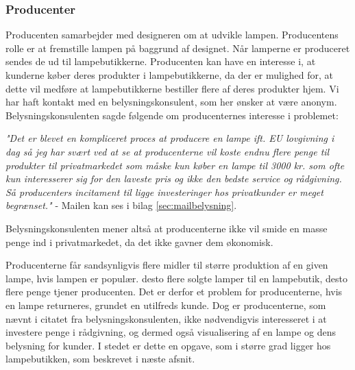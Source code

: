 \subsubsection{Producenter}
Producenten samarbejder med designeren om at udvikle lampen. Producentens rolle er at fremstille lampen på baggrund af designet. Når lamperne er produceret sendes de ud til lampebutikkerne. Producenten kan have en interesse i, at kunderne køber deres produkter i lampebutikkerne, da der er mulighed for, at dette vil medføre at lampebutikkerne bestiller flere af deres produkter hjem. Vi har haft kontakt med en belysningskonsulent, som her ønsker at være anonym. Belysningskonsulenten sagde følgende om producenternes interesse i problemet:

\begin{center}
\textit{"Det er blevet en kompliceret proces at producere en lampe ift. EU lovgivning i dag så jeg har svært ved at se at producenterne vil koste endnu flere penge til produkter til privatmarkedet som måske kun køber en lampe til 3000 kr. som ofte kun interesserer sig for den laveste pris og ikke den bedste service og rådgivning. Så producenters incitament til ligge investeringer hos privatkunder er meget begrænset."} - Mailen kan ses i bilag \ref{sec:mailbelysning}. 
\end{center}

Belysningskonsulenten mener altså at producenterne ikke vil smide en masse penge ind i privatmarkedet, da det ikke gavner dem økonomisk. 

Producenterne får sandsynligvis flere midler til større produktion af en given lampe, hvis lampen er populær. desto flere solgte lamper til en lampebutik, desto flere penge tjener producenten. Det er derfor et problem for producenterne, hvis en lampe returneres, grundet en utilfreds kunde. Dog er producenterne, som nævnt i citatet fra belysningskonsulenten, ikke nødvendigvis interesseret i at investere penge i rådgivning, og dermed også visualisering af en lampe og dens belysning for kunder. I stedet er dette en opgave, som i større grad ligger hos lampebutikken, som beskrevet i næste afsnit.
